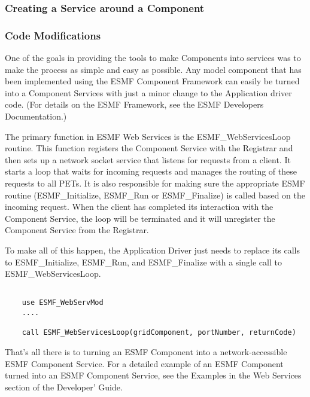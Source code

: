 \subsubsection{Creating a Service around a Component}
\subsubsection{Code Modifications}
One of the goals in providing the tools to make Components into services was to make 
the process as simple and easy as possible.  Any model component that has been 
implemented using the ESMF Component Framework can easily be turned into a 
Component Services with just a minor change to the Application 
driver code.  (For details on the ESMF Framework, see the ESMF Developers Documentation.)

The primary function in ESMF Web Services is the ESMF\_WebServicesLoop routine.  This 
function registers the Component Service with the Registrar and then sets up a 
network socket service that listens for requests from a client.  It starts a loop 
that waits for incoming requests and manages the routing of these requests to 
all PETs.  It is also responsible for making sure the appropriate ESMF 
routine (ESMF\_Initialize, ESMF\_Run or ESMF\_Finalize) is called based on the incoming 
request. When the client has completed its interaction with the Component Service, 
the loop will be terminated and it will unregister the Component Service from the Registrar. 

To make all of this happen, the Application Driver just needs to replace its calls to 
ESMF\_Initialize, ESMF\_Run, and ESMF\_Finalize with a single call to ESMF\_WebServicesLoop. 

\begin{verbatim}

	use ESMF_WebServMod
	....

	call ESMF_WebServicesLoop(gridComponent, portNumber, returnCode)

\end{verbatim}

That's all there is to turning an ESMF Component into a network-accessible 
ESMF Component Service.  For a detailed example of an ESMF Component turned into 
an ESMF Component Service, see the Examples in the Web Services section of the 
Developer' Guide.
